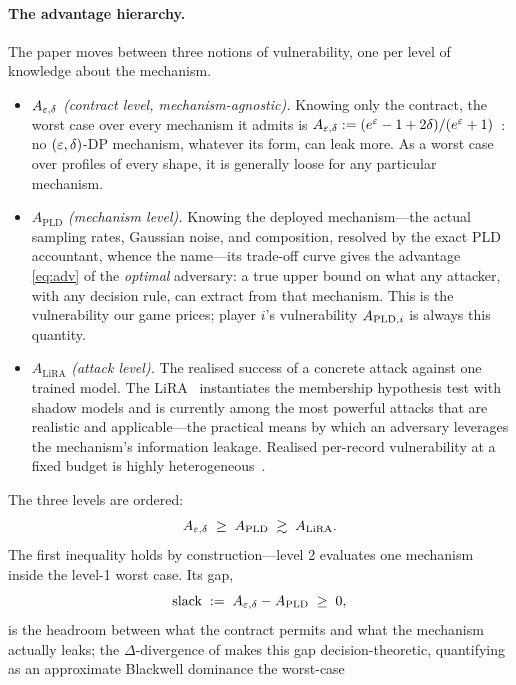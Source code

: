 \paragraph{The advantage hierarchy.} The paper moves between three
notions of vulnerability, one per level of knowledge about the
mechanism.
\begin{itemize}
\item $A_{\varepsilon,\delta}$ \emph{(contract level, mechanism-agnostic).}
  Knowing only the contract, the worst case over every mechanism it
  admits is $A_{\varepsilon,\delta} :=
  (e^{\varepsilon}-1+2\delta)/(e^{\varepsilon}+1)$~\cite{kairouz2015composition,
  kaissis2024beyond}: no $(\varepsilon,\delta)$-DP mechanism, whatever its
  form, can leak more. As a worst case over profiles of every shape,
  it is generally loose for any particular mechanism.
\item $A_{\mathrm{PLD}}$ \emph{(mechanism level).} Knowing the
  deployed mechanism---the actual sampling rates, Gaussian noise, and
  composition, resolved by the exact \ac{PLD}
  accountant, whence the name---its trade-off curve gives the
  advantage \cref{eq:adv} of the \emph{optimal} adversary: a true
  upper bound on what any attacker, with any decision rule, can
  extract from that mechanism. This is the vulnerability our game
  prices; player $i$'s vulnerability $A_{\mathrm{PLD},i}$ is always this
  quantity.
\item $A_{\mathrm{LiRA}}$ \emph{(attack level).} The realised success
  of a concrete attack against one trained model. The
  \ac{LiRA}~\cite{carlini2022membership}
  instantiates the membership hypothesis test with shadow models and
  is currently among the most powerful attacks that are realistic
  and applicable---the practical means by which an adversary
  leverages the mechanism's information leakage. Realised per-record
  vulnerability at a fixed budget is highly
  heterogeneous~\cite{carlini2022privacy}.
\end{itemize}
The three levels are ordered:
\begin{equation}
A_{\varepsilon,\delta} \;\geq\; A_{\mathrm{PLD}} \;\gtrsim\; A_{\mathrm{LiRA}}.
\label{eq:hierarchy}
\end{equation}
The first inequality holds by construction---level 2 evaluates one
mechanism inside the level-1 worst case. Its gap,
\[
\mathrm{slack} \;:=\; A_{\varepsilon, \delta} - A_{\mathrm{PLD}}
\;\geq\; 0 ,
\]
is the headroom between what the contract permits and what the
mechanism actually leaks; the $\Delta$-divergence of
\citet{kaissis2024beyond} makes this gap decision-theoretic,
quantifying as an approximate Blackwell dominance the worst-case
